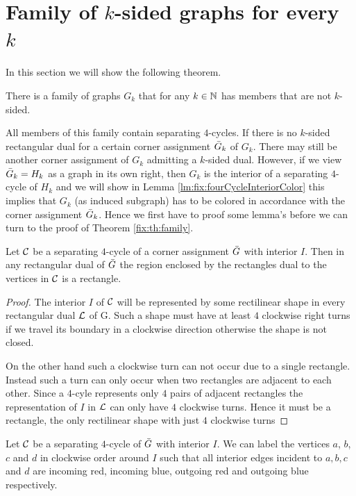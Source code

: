 
\section{Family of $k$-sided graphs for every $k$}
  \label{s:fix}
  In this section we will show the following theorem.

  \begin{thrm}
    \label{fix:th:family}
      There is a family of graphs $G_k$ that for any $k \in \mathbb{N}$ has members that are not $k$-sided.
  \end{thrm}

  All members of this family contain separating $4$-cycles.
  If there is no $k$-sided rectangular dual for a certain corner assignment $\bar{G}_k$ of $G_k$. There may still be another corner assignment of $G_k$ admitting a $k$-sided dual.
  However, if we view $\bar{G}_k = H_k$ as a graph in its own right, then $G_k$ is the interior of a separating $4$-cycle of $H_k$ and we will show in Lemma \ref{lm:fix:fourCycleInteriorColor} this implies that $G_k$ (as induced subgraph) has to be colored in accordance with the corner assignment $\bar{G}_k$. Hence we first have to proof some lemma's before we can turn to the proof of Theorem \ref{fix:th:family}.

  \begin{lemma}
    \label{lm:interiorRectangle}
    Let $\mathcal{C}$ be a separating $4$-cycle of a corner assignment $\bar{G}$ with interior $I$. Then in any rectangular dual of $\bar{G}$ the region enclosed by the rectangles dual to the vertices in $\mathcal{C}$ is a rectangle.
  \end{lemma}
  \begin{proof}
    The interior $I$ of $\mathcal{C}$ will be represented by some rectilinear shape in every rectangular dual $\mathcal{L}$ of G. Such a shape must have at least $4$ clockwise right turns if we travel its boundary in a clockwise direction otherwise the shape is not closed.

    On the other hand such a clockwise turn can not occur due to a single rectangle. Instead such a turn can only occur when two rectangles are adjacent to each other. Since a $4$-cyle represents only $4$ pairs of adjacent rectangles the representation of $I$ in $\mathcal{L}$ can only have $4$ clockwise turns. Hence it must be a rectangle, the only rectilinear shape with just $4$ clockwise turns
  \end{proof}

  \begin{lemma}
  \label{lm:fix:fourCycleInteriorColor}
  Let $\mathcal{C}$ be a separating $4$-cycle of $\bar{G}$ with interior $I$. We can label the vertices $a$, $b$, $c$ and $d$ in clockwise order around $I$ such that all interior edges incident to $a, b, c$ and $d$ are incoming red, incoming blue, outgoing red and outgoing blue respectively.
  \end{lemma}

